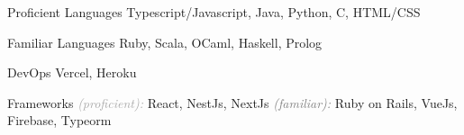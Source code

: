 

\begin{cvskills}

  \cvskill
  {Proficient Languages}
  {Typescript/Javascript, Java, Python, C, HTML/CSS}

  \cvskill
  {Familiar Languages}
  {Ruby, Scala, OCaml, Haskell, Prolog}

  \cvskill
  {DevOps}
  {Vercel, Heroku}

  \cvskill
  {Frameworks}
  {\textcolor{darkgray}{\textit{(proficient):}} React, NestJs, NextJs \textcolor{gray}{\textit{(familiar):}} Ruby on Rails, VueJs, Firebase, Typeorm}

\end{cvskills}
